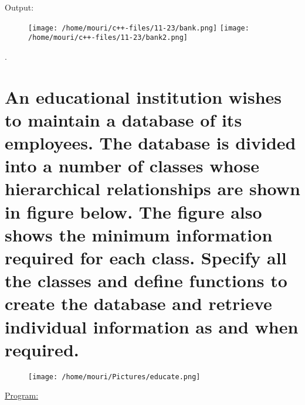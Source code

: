 \documentclass[a4paper,11pt]{article}
\begin{document}
Output:
\begin{figure}[H]
\centering
\texttt{[image: /home/mouri/c++-files/11-23/bank.png]}
\texttt{[image: /home/mouri/c++-files/11-23/bank2.png]}
\end{figure}
.

\section{ An educational institution wishes to maintain a database of its employees. The database is divided into a number of classes whose hierarchical relationships are shown in figure below. The figure also shows the minimum information required for each class. Specify all the classes and define functions to create the database and retrieve individual information as and when required.}
\begin{figure}[H]
\centering
\texttt{[image: /home/mouri/Pictures/educate.png]}
\end{figure}
\underline{Program:}
\end{document}
